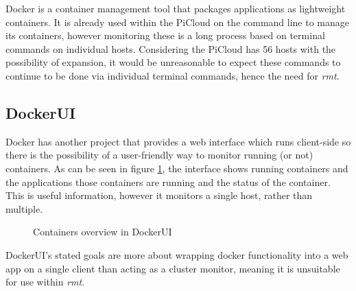 \label{sec:docker}
Docker \citep{docker} is a container management tool that packages applications as lightweight containers.
It is already used within the PiCloud on the command line to manage its containers, however monitoring these is a long process based on terminal commands on individual hosts.
Considering the PiCloud has 56 hosts with the possibility of expansion, it would be unreasonable to expect these commands to continue to be done via individual terminal commands, hence the need for \emph{rmt}.
 
 \subsection{DockerUI}
 Docker has another project that provides a web interface which runs client-side so there is the possibility of a user-friendly way to monitor running (or not) containers.
 As can be seen in figure \ref{fig:dockerUiContainers}, the interface shows running containers and the applications those containers are running and the status of the container.
 This is useful information, however it monitors a single host, rather than multiple.

 \begin{figure}[t]
 	\centering
	\setlength\fboxsep{0pt}
	\setlength\fboxrule{0.5pt}
 	\caption{Containers overview in DockerUI}
 	\label{fig:dockerUiContainers}
 \end{figure}

 DockerUI's stated goals are more about wrapping docker functionality into a web app on a single client than acting as a cluster monitor, meaning it is unsuitable for use within \emph{rmt}.
